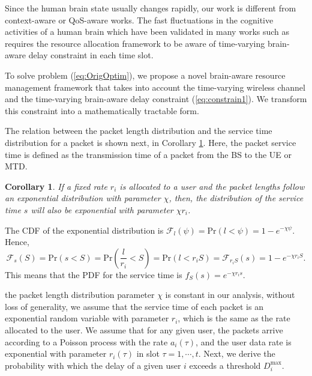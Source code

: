 \documentclass[journal,draftclsnofoot,onecolumn,12pt]{IEEEtran}%
\newtheorem{corollary}{Corollary}
\begin{document}
	{Since the human brain state usually changes rapidly, our work is different from context-aware or QoS-aware works. The fast fluctuations in the cognitive activities of a human brain which have been validated in many works such as \cite{HARI2000455,fox2007spontaneous,laufs2003electroencephalographic} requires the resource allocation framework to be aware of time-varying brain-aware delay constraint in each time slot.}
	
	To solve problem (\ref{eq:OrigOptim}), we propose a novel brain-aware resource management framework that takes into account the time-varying wireless channel and the time-varying brain-aware delay constraint (\ref{eq:constrain1}). 
	{We transform this constraint into a mathematically tractable form.}
	
	
    
	 
	 {The relation between the packet
 length distribution and the service time distribution for a packet is shown next, in Corollary \ref{corol:exponential service time}.} { Here, the packet service time is defined as the transmission time of a packet from the BS to the UE or MTD.}
	\begin{corollary}\label{corol:exponential service time}
		If a fixed rate $r_i$ is allocated to a user and the packet lengths follow an exponential distribution with parameter $\chi$, then, the distribution of the service time $s$ will also be exponential with parameter $\chi r_i$.
	\end{corollary}
	\begin{IEEEproof}
		{The CDF of the exponential distribution is $\mathcal{F}_{l}(\psi)=\text{Pr}(l<\psi)=1-e^{-\chi \psi}$. Hence, 
		\begin{equation}
		\mathcal{F}_s(S)=\text{Pr}(s<S)=\text{Pr}(\frac{l}{r_i}<S)=\text{Pr}(l<r_i S)=\mathcal{F}_{r_i S}(s)=1-e^{-\chi r_i S}.
		\end{equation}}
		This means that the PDF for the service time is $f_S(s)=e^{-\chi r_i s}$.
	\end{IEEEproof}
	{the packet length distribution parameter $\chi$ is constant in our analysis,} without loss of generality, we assume that the service time of each packet is an exponential random variable with parameter $r_i$, which is the same as the rate allocated to the user. 
	We assume that for any given user, the packets arrive {according to a Poisson process } with the rate $a_i(\tau)$, and the user data rate is {exponential with parameter} $r_i(\tau)$ in  slot  $\tau=1,\cdots,t$. Next, we derive the probability with which the delay of a given user $i$ exceeds a threshold $D_i^{\max}$.
\end{document}
